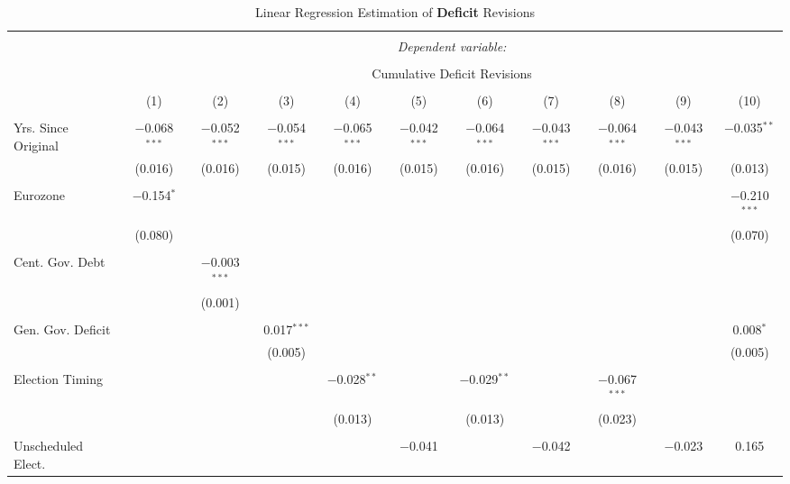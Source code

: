 
\begin{table}[!htbp] \centering 
  \caption{Linear Regression Estimation of \textbf{Deficit} Revisions} 
  \label{deficit_results} 
\tiny 
\begin{tabular}{@{\extracolsep{5pt}}lcccccccccc} 
\\[-1.8ex]\hline 
\hline \\[-1.8ex] 
 & \multicolumn{10}{c}{\textit{Dependent variable:}} \\ 
\cline{2-11} 
\\[-1.8ex] & \multicolumn{10}{c}{Cumulative Deficit Revisions} \\ 
\\[-1.8ex] & (1) & (2) & (3) & (4) & (5) & (6) & (7) & (8) & (9) & (10)\\ 
\hline \\[-1.8ex] 
 Yrs. Since Original & $-$0.068$^{***}$ & $-$0.052$^{***}$ & $-$0.054$^{***}$ & $-$0.065$^{***}$ & $-$0.042$^{***}$ & $-$0.064$^{***}$ & $-$0.043$^{***}$ & $-$0.064$^{***}$ & $-$0.043$^{***}$ & $-$0.035$^{**}$ \\ 
  & (0.016) & (0.016) & (0.015) & (0.016) & (0.015) & (0.016) & (0.015) & (0.016) & (0.015) & (0.013) \\ 
  & & & & & & & & & & \\ 
 Eurozone & $-$0.154$^{*}$ &  &  &  &  &  &  &  &  & $-$0.210$^{***}$ \\ 
  & (0.080) &  &  &  &  &  &  &  &  & (0.070) \\ 
  & & & & & & & & & & \\ 
 Cent. Gov. Debt &  & $-$0.003$^{***}$ &  &  &  &  &  &  &  &  \\ 
  &  & (0.001) &  &  &  &  &  &  &  &  \\ 
  & & & & & & & & & & \\ 
 Gen. Gov. Deficit &  &  & 0.017$^{***}$ &  &  &  &  &  &  & 0.008$^{*}$ \\ 
  &  &  & (0.005) &  &  &  &  &  &  & (0.005) \\ 
  & & & & & & & & & & \\ 
 Election Timing &  &  &  & $-$0.028$^{**}$ &  & $-$0.029$^{**}$ &  & $-$0.067$^{***}$ &  &  \\ 
  &  &  &  & (0.013) &  & (0.013) &  & (0.023) &  &  \\ 
  & & & & & & & & & & \\ 
 Unscheduled Elect. &  &  &  &  & $-$0.041 &  & $-$0.042 &  & $-$0.023 & 0.165 \\ 

\end{tabular}
\end{table}
